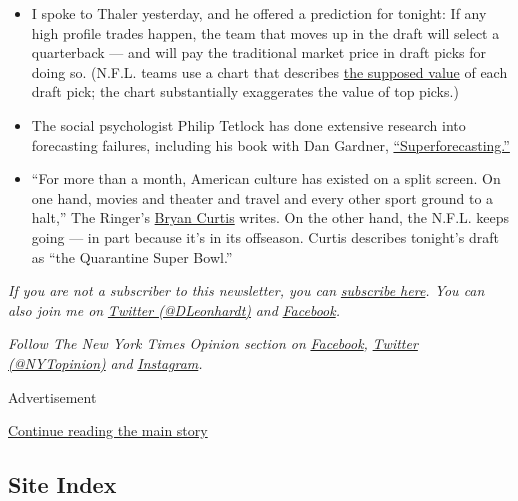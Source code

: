 \begin{itemize}
\item
  I spoke to Thaler yesterday, and he offered a prediction for tonight:
  If any high profile trades happen, the team that moves up in the draft
  will select a quarterback --- and will pay the traditional market
  price in draft picks for doing so. (N.F.L. teams use a chart that
  describes
  \href{https://www.pro-football-reference.com/draft/draft_trade_value.htm}{the
  supposed value} of each draft pick; the chart substantially
  exaggerates the value of top picks.)
\item
  The social psychologist Philip Tetlock has done extensive research
  into forecasting failures, including his book with Dan Gardner,
  \href{https://www.penguinrandomhouse.com/books/227815/superforecasting-by-philip-e-tetlock-and-dan-gardner/}{``Superforecasting.''}
\item
  ``For more than a month, American culture has existed on a split
  screen. On one hand, movies and theater and travel and every other
  sport ground to a halt,'' The Ringer's
  \href{https://www.theringer.com/2020/4/22/21230568/nfl-draft-quarantine-super-bowl-sports-media}{Bryan
  Curtis} writes. On the other hand, the N.F.L. keeps going --- in part
  because it's in its offseason. Curtis describes tonight's draft as
  ``the Quarantine Super Bowl.''
\end{itemize}

\emph{If you are not a subscriber to this newsletter, you can}
\href{https://www.nytimes3xbfgragh.onion/newsletters/david-leonhardt}{\emph{subscribe
here}}\emph{. You can also join me on}
\href{https://twitter.com/DLeonhardt}{\emph{Twitter (@DLeonhardt)}}
\emph{and}
\href{https://www.facebookcorewwwi.onion/DavidRLeonhardt/}{\emph{Facebook}}\emph{.}

\emph{Follow The New York Times Opinion section on}
\href{https://www.facebookcorewwwi.onion/nytopinion}{\emph{Facebook}}\emph{,}
\href{http://twitter.com/NYTOpinion}{\emph{Twitter (@NYTopinion)}}
\emph{and}
\href{https://www.instagram.com/nytopinion/}{\emph{Instagram}}\emph{.}

Advertisement

\protect\hyperlink{after-bottom}{Continue reading the main story}

\hypertarget{site-index}{%
\subsection{Site Index}\label{site-index}}

